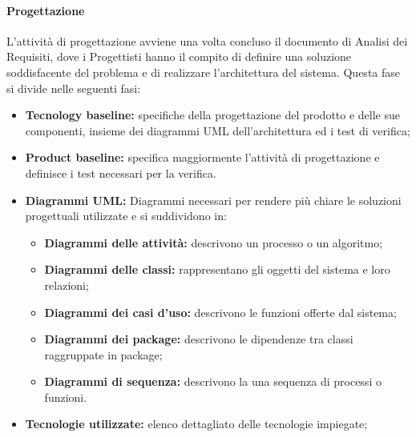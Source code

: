 			\paragraph {Progettazione}
				L'attività di progettazione avviene una volta concluso il documento di Analisi dei Requisiti, dove i Progettisti hanno il compito di definire una soluzione soddisfacente del problema e di realizzare l'architettura del sistema.
				Questa fase si divide nelle seguenti fasi: 
				\begin{itemize}
					\item \textbf{Tecnology baseline:} specifiche della progettazione del prodotto e delle sue componenti, insieme dei diagrammi UML dell'architettura ed i test di verifica;
					\item \textbf{Product baseline:} specifica maggiormente l'attività di progettazione e definisce i test necessari per la verifica. 
					\item \textbf{Diagrammi UML:} Diagrammi necessari per rendere più chiare le soluzioni progettuali utilizzate e si suddividono in:	
					\begin{itemize}
						\item \textbf{Diagrammi delle attività:} descrivono un processo o un algoritmo;
						\item \textbf{Diagrammi delle classi:} rappresentano gli oggetti del sistema e loro relazioni;
						\item \textbf{Diagrammi dei casi d'uso:} descrivono le funzioni offerte dal sistema;
						\item \textbf{Diagrammi dei package:} descrivono le dipendenze tra classi raggruppate in package;
						\item \textbf{Diagrammi di sequenza:} descrivono la una sequenza di processi o funzioni.
					\end{itemize}
					\item \textbf{Tecnologie utilizzate:} elenco dettagliato delle tecnologie impiegate; 
					\end{itemize}	
				
